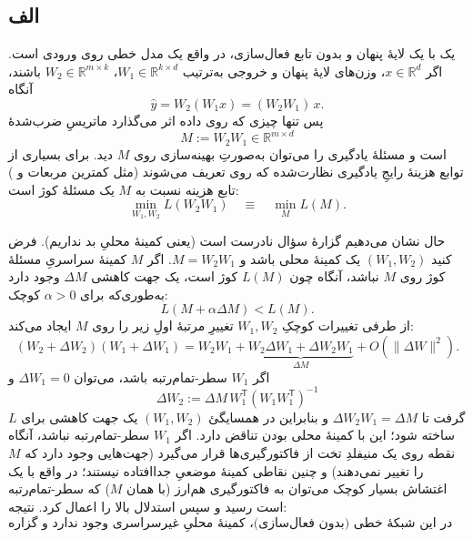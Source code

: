 \subsection*{الف}
یک  با یک لایهٔ پنهان و بدون تابع فعال‌سازی، در واقع یک مدل خطی روی ورودی است. اگر
$x \in \mathbb{R}^{d}$،
وزن‌های لایهٔ پنهان و خروجی به‌ترتیب
$W_1 \in \mathbb{R}^{k \times d}$،
$W_2 \in \mathbb{R}^{m \times k}$
باشند، آنگاه
\[
\hat{y} = W_2 (W_1 x) = (W_2 W_1)\,x.
\]
پس تنها چیزی که روی داده اثر می‌گذارد ماتریسِ ضرب‌شدهٔ
\[
M := W_2 W_1 \in \mathbb{R}^{m \times d}
\]
است و مسئلهٔ یادگیری را می‌توان به‌صورتِ بهینه‌سازی روی $M$ دید. برای بسیاری از توابع هزینهٔ رایجِ یادگیری نظارت‌شده که روی  تعریف می‌شوند (مثل کمترین مربعات و ) تابع هزینه نسبت به $M$ یک مسئلهٔ کوژ است:
\[
\min_{W_1,W_2} L(W_2W_1) \quad \equiv \quad \min_{M} L(M).
\]

حال نشان می‌دهیم گزارهٔ سؤال نادرست است (یعنی کمینهٔ محلیِ بد نداریم).
فرض کنید $(W_1,W_2)$ یک کمینهٔ محلی باشد و $M=W_2W_1$.
اگر $M$ کمینهٔ سراسریِ مسئلهٔ کوژ روی $M$ نباشد، آنگاه چون $L(M)$ کوژ است، یک جهت کاهشی $\Delta M$ وجود دارد به‌طوری‌که برای $\alpha>0$ کوچک:
\[
L(M+\alpha \Delta M) < L(M).
\]
از طرفی تغییرات کوچکِ $W_1,W_2$ تغییرِ مرتبهٔ اولِ زیر را روی $M$ ایجاد می‌کند:
\[
(W_2+\Delta W_2)(W_1+\Delta W_1) = W_2W_1 + \underbrace{W_2\Delta W_1 + \Delta W_2 W_1}_{\Delta M} + O(\|\Delta W\|^2).
\]
اگر $W_1$ سطر-تمام‌رتبه باشد، می‌توان $\Delta W_1=0$ و
\[
\Delta W_2 := \Delta M\, W_1^{\mathsf T} (W_1 W_1^{\mathsf T})^{-1}
\]
گرفت تا $\Delta W_2 W_1 = \Delta M$ و بنابراین در همسایگیٔ $(W_1,W_2)$ یک جهت کاهشی برای $L$ ساخته شود؛ این با کمینهٔ محلی بودن تناقض دارد.
اگر $W_1$ سطر-تمام‌رتبه نباشد، آنگاه نقطه روی یک منیفلدِ تخت از فاکتورگیری‌ها قرار می‌گیرد (جهت‌هایی وجود دارد که $M$ را تغییر نمی‌دهند) و چنین نقاطی کمینهٔ موضعیِ جداافتاده نیستند؛ در واقع با یک اغتشاش بسیار کوچک می‌توان به فاکتورگیری هم‌ارز (با همان $M$) که سطر-تمام‌رتبه است رسید و سپس استدلال بالا را اعمال کرد. نتیجه:
\[
\text{در این شبکهٔ خطی (بدون فعال‌سازی)، کمینهٔ محلیِ غیرسراسری وجود ندارد و گزاره نادرست است.}
\]

